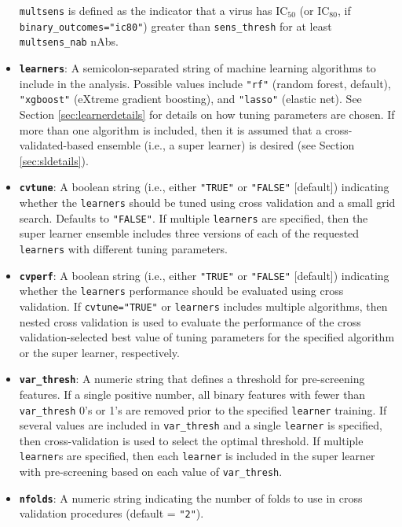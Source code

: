 \documentclass[]{article}
\begin{document}
\begin{itemize}
  \texttt{multsens} is defined as the indicator that a virus has
  IC\(_{50}\) (or IC\(_{80}\), if \texttt{binary\_outcomes="ic80"})
  greater than \texttt{sens\_thresh} for at least \texttt{multsens\_nab}
  nAbs.
\item
  \textbf{\texttt{learners}}: A semicolon-separated string of machine
  learning algorithms to include in the analysis. Possible values
  include \texttt{"rf"} (random forest, default), \texttt{"xgboost"}
  (eXtreme gradient boosting), and \texttt{"lasso"} (elastic net). See
  Section \ref{sec:learnerdetails} for details on how tuning parameters
  are chosen. If more than one algorithm is included, then it is assumed
  that a cross-validated-based ensemble (i.e., a super learner) is
  desired (see Section \ref{sec:sldetails}).
\item
  \textbf{\texttt{cvtune}}: A boolean string (i.e., either
  \texttt{"TRUE"} or \texttt{"FALSE"} {[}default{]}) indicating whether
  the \texttt{learners} should be tuned using cross validation and a
  small grid search. Defaults to \texttt{"FALSE"}. If multiple
  \texttt{learners} are specified, then the super learner ensemble
  includes three versions of each of the requested \texttt{learners}
  with different tuning parameters.
\item
  \textbf{\texttt{cvperf}}: A boolean string (i.e., either
  \texttt{"TRUE"} or \texttt{"FALSE"} {[}default{]}) indicating whether
  the \texttt{learners} performance should be evaluated using cross
  validation. If \texttt{cvtune="TRUE"} or \texttt{learners} includes
  multiple algorithms, then nested cross validation is used to evaluate
  the performance of the cross validation-selected best value of tuning
  parameters for the specified algorithm or the super learner,
  respectively.
\item
  \textbf{\texttt{var\_thresh}}: A numeric string that defines a
  threshold for pre-screening features. If a single positive number, all
  binary features with fewer than \texttt{var\_thresh} 0's or 1's are
  removed prior to the specified \texttt{learner} training. If several
  values are included in \texttt{var\_thresh} and a single
  \texttt{learner} is specified, then cross-validation is used to select
  the optimal threshold. If multiple \texttt{learner}s are specified,
  then each \texttt{learner} is included in the super learner with
  pre-screening based on each value of \texttt{var\_thresh}.
\item
  \textbf{\texttt{nfolds}}: A numeric string indicating the number of
  folds to use in cross validation procedures (default = \texttt{"2"}).

\end{itemize}
\end{document}
